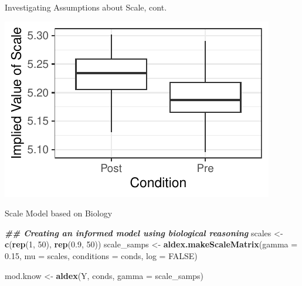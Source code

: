 \documentclass[
  ignorenonframetext,
]{beamer}
\newenvironment{Shaded}{\begin{snugshade}}{\end{snugshade}}
\newcommand{\AttributeTok}[1]{\textcolor[rgb]{0.13,0.29,0.53}{#1}}
\newcommand{\ConstantTok}[1]{\textcolor[rgb]{0.56,0.35,0.01}{#1}}
\newcommand{\DecValTok}[1]{\textcolor[rgb]{0.00,0.00,0.81}{#1}}
\newcommand{\DocumentationTok}[1]{\textcolor[rgb]{0.56,0.35,0.01}{\textbf{\textit{#1}}}}
\newcommand{\FloatTok}[1]{\textcolor[rgb]{0.00,0.00,0.81}{#1}}
\newcommand{\FunctionTok}[1]{\textcolor[rgb]{0.13,0.29,0.53}{\textbf{#1}}}
\newcommand{\NormalTok}[1]{#1}
\newcommand{\OtherTok}[1]{\textcolor[rgb]{0.56,0.35,0.01}{#1}}
\begin{document}
\begin{frame}{Investigating Assumptions about Scale, cont.}
\protect\hypertarget{investigating-assumptions-about-scale-cont.}{}
\begin{center}\includegraphics{slides_files/figure-beamer/unnamed-chunk-5-1} \end{center}
\end{frame}

\begin{frame}[fragile]{Scale Model based on Biology}
\protect\hypertarget{scale-model-based-on-biology}{}
\begin{Shaded}
\begin{Highlighting}[]
\DocumentationTok{\#\# Creating an informed model using biological reasoning}
\NormalTok{scales }\OtherTok{\textless{}{-}} \FunctionTok{c}\NormalTok{(}\FunctionTok{rep}\NormalTok{(}\DecValTok{1}\NormalTok{, }\DecValTok{50}\NormalTok{), }\FunctionTok{rep}\NormalTok{(}\FloatTok{0.9}\NormalTok{, }\DecValTok{50}\NormalTok{))}
\NormalTok{scale\_samps }\OtherTok{\textless{}{-}} \FunctionTok{aldex.makeScaleMatrix}\NormalTok{(}\AttributeTok{gamma =} \FloatTok{0.15}\NormalTok{, }\AttributeTok{mu =}\NormalTok{ scales,}
    \AttributeTok{conditions =}\NormalTok{ conds, }\AttributeTok{log =} \ConstantTok{FALSE}\NormalTok{)}

\NormalTok{mod.know }\OtherTok{\textless{}{-}} \FunctionTok{aldex}\NormalTok{(Y, conds, }\AttributeTok{gamma =}\NormalTok{ scale\_samps)}
\end{Highlighting}
\end{Shaded}
\end{frame}
\end{document}
